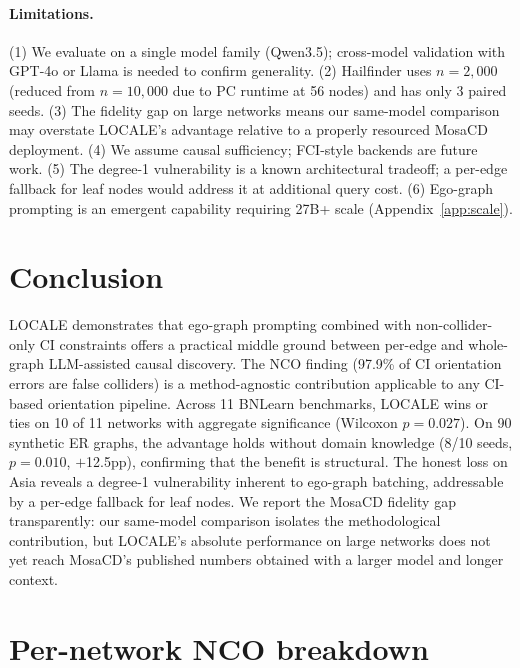\documentclass{article}
\begin{document}
\paragraph{Limitations.}
(1) We evaluate on a single model family (Qwen3.5); cross-model validation with GPT-4o or Llama is needed to confirm generality. (2) Hailfinder uses $n{=}2{,}000$ (reduced from $n{=}10{,}000$ due to PC runtime at 56 nodes) and has only 3 paired seeds. (3) The fidelity gap on large networks means our same-model comparison may overstate LOCALE's advantage relative to a properly resourced MosaCD deployment. (4) We assume causal sufficiency; FCI-style backends are future work. (5) The degree-1 vulnerability is a known architectural tradeoff; a per-edge fallback for leaf nodes would address it at additional query cost. (6) Ego-graph prompting is an emergent capability requiring 27B+ scale (Appendix~\ref{app:scale}).

\section{Conclusion}

LOCALE demonstrates that ego-graph prompting combined with non-collider-only CI constraints offers a practical middle ground between per-edge and whole-graph LLM-assisted causal discovery. The NCO finding (97.9\% of CI orientation errors are false colliders) is a method-agnostic contribution applicable to any CI-based orientation pipeline. Across 11 BNLearn benchmarks, LOCALE wins or ties on 10 of 11 networks with aggregate significance (Wilcoxon $p{=}0.027$). On 90 synthetic ER graphs, the advantage holds without domain knowledge (8/10 seeds, $p{=}0.010$, $+$12.5pp), confirming that the benefit is structural. The honest loss on Asia reveals a degree-1 vulnerability inherent to ego-graph batching, addressable by a per-edge fallback for leaf nodes. We report the MosaCD fidelity gap transparently: our same-model comparison isolates the methodological contribution, but LOCALE's absolute performance on large networks does not yet reach MosaCD's published numbers obtained with a larger model and longer context.




\appendix
\section{Per-network NCO breakdown}
\label{app:nco-per-network}
\end{document}
